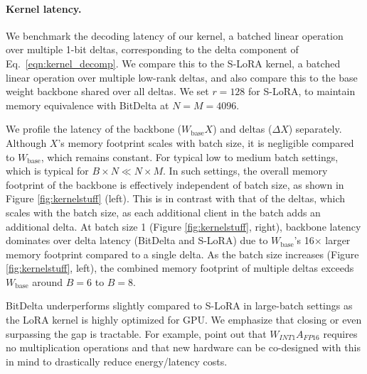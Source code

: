 \documentclass[numbers]{article}
\newcommand{\oursmethod}{BitDelta\xspace}
\begin{document}
\paragraph{Kernel latency.}
We benchmark the decoding latency of our kernel, a batched linear operation over multiple 1-bit deltas, corresponding to the delta component of Eq.~\eqref{eqn:kernel_decomp}. We compare this to the S-LoRA kernel, a batched linear operation over multiple low-rank deltas, and also compare this to the base weight backbone shared over all deltas. We set $r=128$ for S-LoRA, to maintain memory equivalence with \oursmethod at $N=M=4096$.

We profile the latency of the backbone ($W_\text{base}X$) and deltas ($\Delta X$) separately. Although $X$'s memory footprint scales with batch size, it is negligible compared to $W_\text{base}$, which remains constant. For typical low to medium batch settings, which is typical for $B \times N \ll N \times M$. In such settings, the overall memory footprint of the backbone is effectively independent of batch size, as shown in Figure \ref{fig:kernelstuff} (left). This is in contrast with that of the deltas, which scales with the batch size, as each additional client in the batch adds an additional delta. At batch size 1 (Figure \ref{fig:kernelstuff}, right), backbone latency dominates over delta latency (\oursmethod and S-LoRA) due to $W_\text{base}$'s 16$\times$ larger memory footprint compared to a single delta. As the batch size increases (Figure \ref{fig:kernelstuff}, left), the combined memory footprint of multiple deltas exceeds $W_\text{base}$ around $B=6$ to $B=8$.

\oursmethod underperforms slightly compared to S-LoRA in large-batch settings as the LoRA kernel is highly optimized for GPU. We emphasize that closing or even surpassing the gap is tractable. For example, \citet{ma2024era} point out that $W_{INT1}A_{FP16}$ requires no multiplication operations and that new hardware can be co-designed with this in mind to drastically reduce energy/latency costs.
\end{document}
